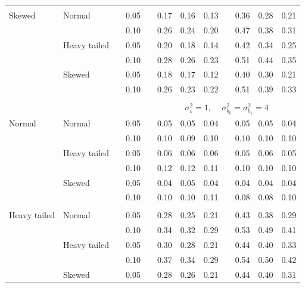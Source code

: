 \documentclass[12pt]{article} %
\begin{document}
\begin{table}[ht]
\begin{scriptsize}
\begin{center}
\begin{tabular}{ll p{.1cm} c p{.1cm} rrr p{.1cm} rrr}
             &&&&&&&&&&&\\
Skewed       & Normal       && 0.05 &&   0.17 & 0.16 & 0.13 && 0.36 & 0.28 & 0.21 \\ 
             &              && 0.10 &&   0.26 & 0.24 & 0.20 && 0.47 & 0.38 & 0.31 \\ 
             & Heavy tailed && 0.05 &&   0.20 & 0.18 & 0.14 && 0.42 & 0.34 & 0.25 \\ 
             &              && 0.10 &&   0.28 & 0.26 & 0.23 && 0.51 & 0.44 & 0.35 \\ 
             & Skewed       && 0.05 &&   0.18 & 0.17 & 0.12 && 0.40 & 0.30 & 0.21 \\ 
             &              && 0.10 &&   0.26 & 0.23 & 0.22 && 0.51 & 0.39 & 0.33 \\ 

&&&&&&&&&&&\\
& && && \multicolumn{7}{c}{$\sigma_{\varepsilon}^2 = 1$, \ \ $\sigma_{b_0}^2 = \sigma_{b_1}^2 = 4$} \\ \cline{6-12}
\rowcolor{gray!20}Normal       & Normal       && 0.05 &&  0.05 & 0.05 & 0.04 && 0.05 & 0.05 & 0.04 \\ 
\rowcolor{gray!20}             &              && 0.10 &&  0.10 & 0.09 & 0.10 && 0.10 & 0.10 & 0.10 \\ 
\rowcolor{gray!20}             & Heavy tailed && 0.05 &&  0.06 & 0.06 & 0.06 && 0.05 & 0.06 & 0.05 \\ 
\rowcolor{gray!20}             &              && 0.10 &&  0.12 & 0.12 & 0.11 && 0.10 & 0.10 & 0.10 \\ 
\rowcolor{gray!20}             & Skewed       && 0.05 &&  0.04 & 0.05 & 0.04 && 0.04 & 0.04 & 0.04 \\ 
\rowcolor{gray!20}             &              && 0.10 &&  0.10 & 0.10 & 0.11 && 0.08 & 0.08 & 0.10 \\ 
             &&&&&&&&&&&\\
Heavy tailed & Normal       && 0.05 &&  0.28 & 0.25 & 0.21 && 0.43 & 0.38 & 0.29 \\ 
             &              && 0.10 &&  0.34 & 0.32 & 0.29 && 0.53 & 0.49 & 0.41 \\ 
             & Heavy tailed && 0.05 &&  0.30 & 0.28 & 0.21 && 0.44 & 0.40 & 0.33 \\ 
             &              && 0.10 &&  0.37 & 0.34 & 0.29 && 0.54 & 0.50 & 0.42 \\ 
             & Skewed       && 0.05 &&  0.28 & 0.26 & 0.21 && 0.44 & 0.40 & 0.31 \\ 

\end{tabular}
\end{center}
\end{scriptsize}
\end{table}
\end{document}
